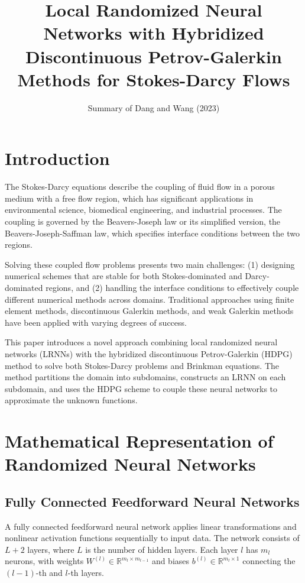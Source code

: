 \documentclass[11pt,a4paper]{article}
\title{Local Randomized Neural Networks with Hybridized Discontinuous Petrov-Galerkin Methods for Stokes-Darcy Flows}
\author{Summary of Dang and Wang (2023)}
\date{}
\begin{document}
\maketitle

\section{Introduction}

The Stokes-Darcy equations describe the coupling of fluid flow in a porous medium with a free flow region, which has significant applications in environmental science, biomedical engineering, and industrial processes. The coupling is governed by the Beavers-Joseph law or its simplified version, the Beavers-Joseph-Saffman law, which specifies interface conditions between the two regions.

Solving these coupled flow problems presents two main challenges: (1) designing numerical schemes that are stable for both Stokes-dominated and Darcy-dominated regions, and (2) handling the interface conditions to effectively couple different numerical methods across domains. Traditional approaches using finite element methods, discontinuous Galerkin methods, and weak Galerkin methods have been applied with varying degrees of success.

This paper introduces a novel approach combining local randomized neural networks (LRNNs) with the hybridized discontinuous Petrov-Galerkin (HDPG) method to solve both Stokes-Darcy problems and Brinkman equations. The method partitions the domain into subdomains, constructs an LRNN on each subdomain, and uses the HDPG scheme to couple these neural networks to approximate the unknown functions.

\section{Mathematical Representation of Randomized Neural Networks}

\subsection{Fully Connected Feedforward Neural Networks}

A fully connected feedforward neural network applies linear transformations and nonlinear activation functions sequentially to input data. The network consists of $L+2$ layers, where $L$ is the number of hidden layers. Each layer $l$ has $m_l$ neurons, with weights $W^{(l)} \in \mathbb{R}^{m_l \times m_{l-1}}$ and biases $b^{(l)} \in \mathbb{R}^{m_l \times 1}$ connecting the $(l-1)$-th and $l$-th layers.
\end{document}
